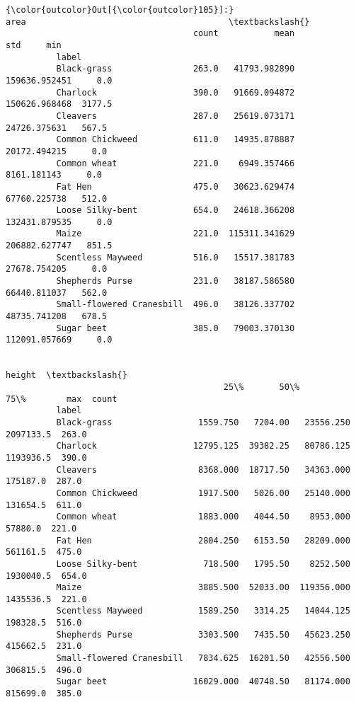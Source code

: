 \documentclass[11pt]{article}
\begin{document}
\begin{Verbatim}[commandchars=\\\{\}]
{\color{outcolor}Out[{\color{outcolor}105}]:}                             area                                        \textbackslash{}
                                     count           mean            std     min   
          label                                                                    
          Black-grass                263.0   41793.982890  159636.952451     0.0   
          Charlock                   390.0   91669.094872  150626.968468  3177.5   
          Cleavers                   287.0   25619.073171   24726.375631   567.5   
          Common Chickweed           611.0   14935.878887   20172.494215     0.0   
          Common wheat               221.0    6949.357466    8161.181143     0.0   
          Fat Hen                    475.0   30623.629474   67760.225738   512.0   
          Loose Silky-bent           654.0   24618.366208  132431.879535     0.0   
          Maize                      221.0  115311.341629  206882.627747   851.5   
          Scentless Mayweed          516.0   15517.381783   27678.754205     0.0   
          Shepherds Purse            231.0   38187.586580   66440.811037   562.0   
          Small-flowered Cranesbill  496.0   38126.337702   48735.741208   678.5   
          Sugar beet                 385.0   79003.370130  112091.057669     0.0   
          
                                                                                height  \textbackslash{}
                                           25\%       50\%         75\%        max  count   
          label                                                                          
          Black-grass                 1559.750   7204.00   23556.250  2097133.5  263.0   
          Charlock                   12795.125  39382.25   80786.125  1193936.5  390.0   
          Cleavers                    8368.000  18717.50   34363.000   175187.0  287.0   
          Common Chickweed            1917.500   5026.00   25140.000   131654.5  611.0   
          Common wheat                1883.000   4044.50    8953.000    57880.0  221.0   
          Fat Hen                     2804.250   6153.50   28209.000   561161.5  475.0   
          Loose Silky-bent             718.500   1795.50    8252.500  1930040.5  654.0   
          Maize                       3885.500  52033.00  119356.000  1435536.5  221.0   
          Scentless Mayweed           1589.250   3314.25   14044.125   198328.5  516.0   
          Shepherds Purse             3303.500   7435.50   45623.250   415662.5  231.0   
          Small-flowered Cranesbill   7834.625  16201.50   42556.500   306815.5  496.0   
          Sugar beet                 16029.000  40748.50   81174.000   815699.0  385.0   
          

\end{Verbatim}
\end{document}
